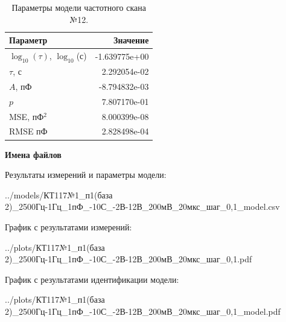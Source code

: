 \begin{table}[!ht]
    \centering
    \caption{Параметры модели частотного скана №12.}
    \begin{tabular}{|l|r|}
        \hline
        Параметр                                       & Значение                  \\ \hline
        $\log_{10}(\tau)$, $\log_{10}$(с)              & -1.639775e+00             \\ \hline
        $\tau$, с                                      & 2.292054e-02              \\ \hline
        $A$, пФ                                        & -8.794832e-03             \\ \hline
        $p$                                            & 7.807170e-01              \\ \hline
        MSE, пФ$^2$                                    & 8.000399e-08              \\ \hline
        RMSE пФ                                        & 2.828498e-04              \\ \hline
    \end{tabular}
    \label{table:frequency_scan_model_12}
\end{table}

\textbf{Имена файлов}

Результаты измерений и параметры модели:

\scriptsize../models/КТ117№1\_п1(база 2)\_2500Гц-1Гц\_1пФ\_-10С\_-2В-12В\_200мВ\_20мкс\_шаг\_0,1\_model.csv
\normalsize

График с результатами измерений:

\scriptsize../plots/КТ117№1\_п1(база 2)\_2500Гц-1Гц\_1пФ\_-10С\_-2В-12В\_200мВ\_20мкс\_шаг\_0,1.pdf
\normalsize

График с результатами идентификации модели:

\scriptsize../plots/КТ117№1\_п1(база 2)\_2500Гц-1Гц\_1пФ\_-10С\_-2В-12В\_200мВ\_20мкс\_шаг\_0,1\_model.pdf
\normalsize

